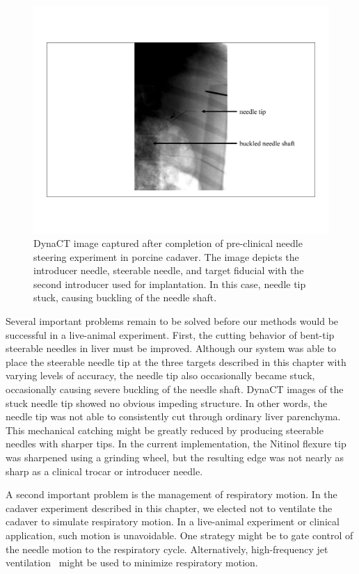 \begin{figure}[!t]
\centering
\includegraphics[width = \columnwidth]{./Images/Chapter5/TargetsCT/FailedTargetsCT.pdf}%
\caption[DynaCT images captured after failed pre-clinical experiment]{DynaCT image captured after completion of pre-clinical needle steering experiment in porcine cadaver. The image depicts the introducer needle, steerable needle, and target fiducial with the second introducer used for implantation. In this case, needle tip stuck, causing buckling of the needle shaft.}
\label{fig:FailedCadaverTargetsCT}
\end{figure} 

Several important problems remain to be solved before our methods would be successful in a live-animal experiment. First, the cutting behavior of bent-tip steerable needles in liver must be improved. Although our system was able to place the steerable needle tip at the three targets described in this chapter with varying levels of accuracy, the needle tip also occasionally became stuck, occasionally causing severe buckling of the needle shaft. DynaCT images of the stuck needle tip showed no obvious impeding structure. In other words, the needle tip was not able to consistently cut through ordinary liver parenchyma. This mechanical catching might be greatly reduced by producing steerable needles with sharper tips. In the current implementation, the Nitinol flexure tip was sharpened using a grinding wheel, but the resulting edge was not nearly as sharp as a clinical trocar or introducer needle.

A second important problem is the management of respiratory motion. In the cadaver experiment described in this chapter, we elected not to ventilate the cadaver to simulate respiratory motion. In a live-animal experiment or clinical application, such motion is unavoidable. One strategy might be to gate control of the needle motion to the respiratory cycle. Alternatively, high-frequency jet ventilation~\cite{Denys2014} might be used to minimize respiratory motion.


